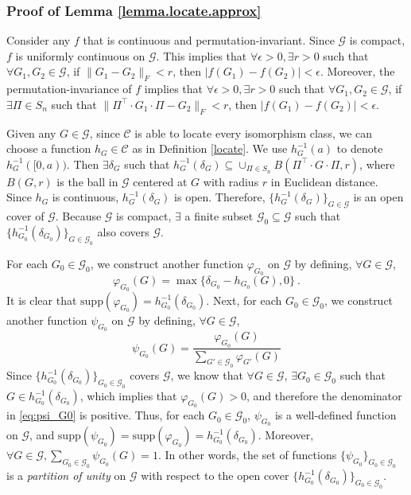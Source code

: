 \documentclass{article}
\def\Gfun{\mathcal{G}}
\begin{document}
\subsubsection{Proof of Lemma \ref{lemma.locate.approx}}
Consider any $f$ that is continuous and permutation-invariant. Since $\Gfun$ is compact, $f$ is uniformly continuous on $\Gfun$. This implies that $\forall \epsilon > 0, \exists r > 0$ such that $\forall G_1, G_2 \in \Gfun$, if $\| G_1 - G_2 \|_F < r$, then $|f(G_1) - f(G_2)| < \epsilon$. Moreover, the permutation-invariance of $f$ implies that $\forall \epsilon > 0, \exists r > 0$ such that $\forall G_1, G_2 \in \Gfun$, if $\exists \Pi \in S_n$ such that $\| \Pi^\intercal \cdot G_1 \cdot \Pi - G_2 \|_F < r$, then $|f(G_1) - f(G_2)| < \epsilon$.

Given any $G \in \Gfun$, since $\mathcal{C}$ is able to locate every isomorphism class, we can choose a function $h_G \in \mathcal{C}$ as in Definition \ref{locate}. We use $h_G^{-1}(a)$ to denote $h_G^{-1}([0, a))$. Then $\exists \delta_G$ such that $h_G^{-1}(\delta_G) \subseteq \cup_{\Pi \in S_n} B(\Pi^\intercal \cdot G \cdot \Pi, r)$, where $B(G, r)$ is the ball in $\Gfun$ centered at $G$ with radius $r$ in Euclidean distance. Since $h_G$ is continuous, $h_G^{-1}(\delta_G)$ is open. Therefore, $\{ h_G^{-1}(\delta_G) \}_{G \in \Gfun}$ is an open cover of $\Gfun$. Because $\Gfun$ is compact, $\exists$ a finite subset $\Gfun_0 \subseteq \Gfun$ such that $\{ h_{G_0}^{-1}(\delta_{G_0}) \}_{G \in \Gfun_0}$ also covers $\Gfun$.

For each $G_0 \in \Gfun_0$, we construct another function $\varphi_{G_0}$ on $\Gfun$ by defining, $\forall G \in \Gfun$,
\begin{equation*}
    \varphi_{G_0}(G) = \max\{ \delta_{G_0} - h_{G_0}(G), 0 \}~.
\end{equation*}
It is clear that $\text{supp}(\varphi_{G_0}) = h_{G_0}^{-1}(\delta_{G_0})$. Next, for each $G_0 \in \Gfun_0$, we construct another function $\psi_{G_0}$ on $\Gfun$ by defining, $\forall G \in \Gfun$,
\begin{equation*}
\label{eq:psi_G0}
    \psi_{G_0}(G) = \frac{\varphi_{G_0}(G)}{\sum_{G' \in \Gfun_0} \varphi_{G'}(G)}
\end{equation*}
Since $\{ h_{G_0}^{-1}(\delta_{G_0}) \}_{G_0 \in \Gfun_0}$ covers $\Gfun$, we know that $\forall G \in \Gfun$,  $\exists G_0 \in \Gfun_0$ such that $G \in h_{G_0}^{-1}(\delta_{G_0})$, which implies that $\varphi_{G_0}(G) > 0$, and therefore the denominator in \eqref{eq:psi_G0} is positive. Thus, for each $G_0 \in \Gfun_0$, $\psi_{G_0}$ is a well-defined function on $\Gfun$, and $\text{supp}(\psi_{G_0}) = \text{supp}(\varphi_{G_0}) = h_{G_0}^{-1}(\delta_{G_0})$. Moreover, $\forall G \in \Gfun, \sum_{G_0 \in \Gfun_0} \psi_{G_0}(G) = 1$. In other words, the set of functions $\{ \psi_{G_0} \}_{G_0 \in \Gfun_0}$ is a \emph{partition of unity} on $\Gfun$ with respect to the open cover $\{ h_{G_0}^{-1}(\delta_{G_0}) \}_{G_0 \in \Gfun_0}$.
\end{document}
